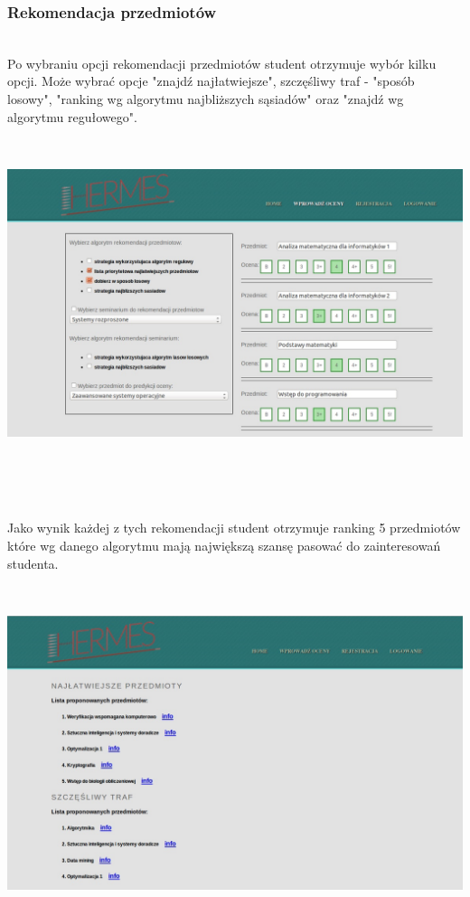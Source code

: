 \documentclass[licencjacka]{pracamgr}
\begin{document}
\subsubsection{Rekomendacja przedmiotów} ~\\ \indent
Po wybraniu opcji rekomendacji przedmiotów student otrzymuje wybór kilku opcji. Może wybrać opcje "znajdź najłatwiejsze", szczęśliwy traf - "sposób losowy", "ranking wg algorytmu najbliższych sąsiadów" oraz "znajdź wg algorytmu regułowego". \par
 ~\\
\begin{minipage}{\linewidth}
	\centering
           \includegraphics[scale=0.5]{rekPrzedm.jpg}
\end{minipage} \\  \\ \\

\newpage

Jako wynik każdej z tych rekomendacji student otrzymuje ranking 5 przedmiotów które wg danego algorytmu mają największą szansę pasować do zainteresowań studenta. \par
 ~\\
\begin{minipage}{\linewidth} 
	\centering
           \includegraphics[scale=0.5]{rekPrzedmRank.jpg}
\end{minipage} \\ 
\end{document}
